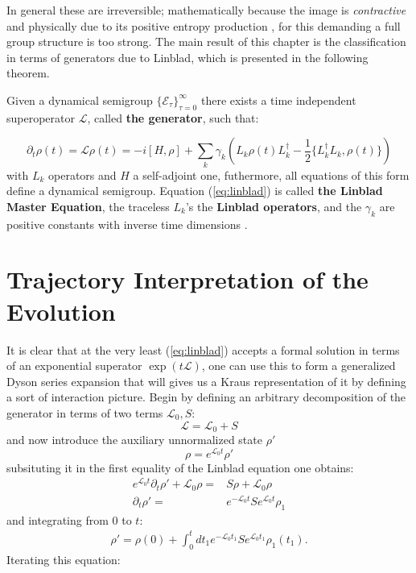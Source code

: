 In general these are irreversible; mathematically because the image is \textit{contractive} and physically due to its
positive entropy production \cite{breuer2002theory}, for this demanding a full group structure is too strong. The main result
of this chapter is the classification in terms of generators due to Linblad, which is presented in the following theorem.

\begin{theorem}
  Given a dynamical semigroup $\{\mathcal{E}_{\tau}\}_{\tau=0}^{\infty}$ there exists a time independent superoperator $\mathcal{L}$, called
  \textbf{the generator}, such that:

  \begin{equation}\label{eq:linblad}
  \partial_{t}\rho(t) = \mathcal{L}\rho(t) = -i[ H,\rho ] + \sum_{k}\gamma_{k}\left(L_{k}\rho(t) L_{k}^{\dagger} - \frac{1}{2}\{L_{k}^{\dagger}L_{k}, \rho(t)\}\right)
  \end{equation}
  with $L_{k}$ operators  and $H$ a self-adjoint one, futhermore, all equations of this form define a dynamical semigroup.
  Equation (\ref{eq:linblad}) is called \textbf{the Linblad Master Equation}, the traceless $L_{k}$'s the \textbf{Linblad operators}, and
  the $\gamma_{k}$ are positive constants with inverse time dimensions \cite{breuer2002theory, lindblad1976generators, wiseman_quantum_2010,hornberger2009introduction}.
\end{theorem}

\section{Trajectory Interpretation of the Evolution}
It is clear that at the very least (\ref{eq:linblad}) accepts a formal solution in terms of an exponential superator $\exp(t\mathcal{L})$, one
can use this to form a generalized Dyson series expansion that will gives us a Kraus representation of it by defining a sort
of interaction picture. Begin by defining an
arbitrary decomposition of the generator in terms of two terms $\mathcal{L}_{0}, S$:
\begin{equation}
  \mathcal{L} = \mathcal{L}_{0} + S
\end{equation}
and now introduce the auxiliary unnormalized state $\rho'$
\begin{equation}
\rho = e^{\mathcal{L}_{0}t}\rho'
\end{equation}
subsituting it in the first equality of the Linblad equation one obtains:
\begin{align}
  e^{\mathcal{L}_{0}t}\partial_{t}\rho' + \mathcal{L}_{0}\rho =& S\rho + \mathcal{L}_{0}\rho \\
\partial_{t}\rho' =& e^{-\mathcal{L}_{0}t}Se^{\mathcal{L}_{0}t}\rho_{1}
\end{align}
and integrating from 0 to $t$:
\begin{align}
\rho' = \rho(0) + \int_{0}^{t}dt_{1} e^{-\mathcal{L}_{0}t_{1}}Se^{\mathcal{L}_{0}t_{1}}\rho_{1}(t_{1}).
\end{align}
Iterating this equation:

